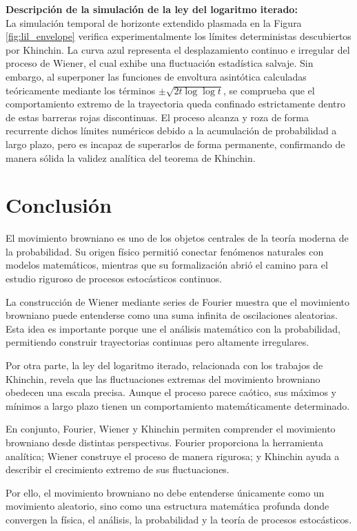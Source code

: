 \documentclass[12pt]{article}
\begin{document}
\textbf{Descripción de la simulación de la ley del logaritmo iterado:} \\
La simulación temporal de horizonte extendido plasmada en la Figura \ref{fig:lil_envelope} verifica experimentalmente los límites deterministas descubiertos por Khinchin. La curva azul representa el desplazamiento continuo e irregular del proceso de Wiener, el cual exhibe una fluctuación estadística salvaje. Sin embargo, al superponer las funciones de envoltura asintótica calculadas teóricamente mediante los términos $\pm\sqrt{2t \log \log t}$, se comprueba que el comportamiento extremo de la trayectoria queda confinado estrictamente dentro de estas barreras rojas discontinuas. El proceso alcanza y roza de forma recurrente dichos límites numéricos debido a la acumulación de probabilidad a largo plazo, pero es incapaz de superarlos de forma permanente, confirmando de manera sólida la validez analítica del teorema de Khinchin.


\section{Conclusión}

El movimiento browniano es uno de los objetos centrales de la teoría moderna de la probabilidad. Su origen físico permitió conectar fenómenos naturales con modelos matemáticos, mientras que su formalización abrió el camino para el estudio riguroso de procesos estocásticos continuos.

La construcción de Wiener mediante series de Fourier muestra que el movimiento browniano puede entenderse como una suma infinita de oscilaciones aleatorias. Esta idea es importante porque une el análisis matemático con la probabilidad, permitiendo construir trayectorias continuas pero altamente irregulares.

Por otra parte, la ley del logaritmo iterado, relacionada con los trabajos de Khinchin, revela que las fluctuaciones extremas del movimiento browniano obedecen una escala precisa. Aunque el proceso parece caótico, sus máximos y mínimos a largo plazo tienen un comportamiento matemáticamente determinado.

En conjunto, Fourier, Wiener y Khinchin permiten comprender el movimiento browniano desde distintas perspectivas. Fourier proporciona la herramienta analítica; Wiener construye el proceso de manera rigurosa; y Khinchin ayuda a describir el crecimiento extremo de sus fluctuaciones.

Por ello, el movimiento browniano no debe entenderse únicamente como un movimiento aleatorio, sino como una estructura matemática profunda donde convergen la física, el análisis, la probabilidad y la teoría de procesos estocásticos.
\end{document}
